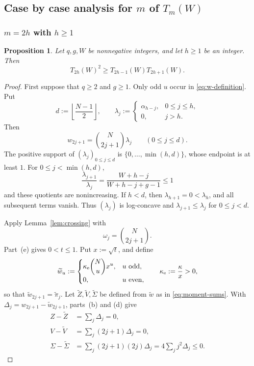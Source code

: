 \documentclass[12pt]{amsart}
\theoremstyle{plain}
\newtheorem{proposition}[theorem]{Proposition}
\theoremstyle{definition}
\theoremstyle{remark}
\begin{document}
\subsection{Case by case analysis for \(m\) of \(T_m(W)\)}

\subsubsection{\(m=2h\) with \(h\ge1\)}

\begin{proposition}\label{prop:even-centres}
Let \(q,g,W\) be nonnegative integers, and let \(h\ge1\) be an integer.
Then
\[
 T_{2h}(W)^2\ge T_{2h-1}(W)T_{2h+1}(W).
\]
\end{proposition}

\begin{proof}
First suppose that \(q\ge2\) and \(g\ge1\).  Only odd \(u\) occur in
\eqref{eq:w-definition}.  Put
\[
 d:=\left\lfloor\frac{N-1}{2}\right\rfloor,
 \qquad
 \lambda_j:=
 \begin{cases}
  \alpha_{h-j},&0\le j\le h,\\
  0,&j>h.
 \end{cases}
\]
Then
\[
 w_{2j+1}=\binom N{2j+1}\lambda_j
 \qquad(0\le j\le d).
\]
The positive support of \((\lambda_j)_{0\le j\le d}\) is
\(\{0,\ldots,\min(h,d)\}\), whose endpoint is at least \(1\).  For
\(0\le j<\min(h,d)\),
\[
 \frac{\lambda_{j+1}}{\lambda_j}
 =
 \frac{W+h-j}{W+h-j+g-1}
 \le1
\]
and these quotients are nonincreasing.  If \(h<d\), then
\(\lambda_{h+1}=0<\lambda_h\), and all subsequent terms vanish.  Thus
\((\lambda_j)\) is log-concave and
\(\lambda_{j+1}\le\lambda_j\) for \(0\le j<d\).

Apply Lemma~\ref{lem:crossing} with
\[
 \omega_j=\binom N{2j+1}.
\]
Part~\textup{(e)} gives \(0<t\le1\).  Put \(x:=\sqrt t\), and define
\[
 \widetilde w_u:=
 \begin{cases}
  \displaystyle\kappa_{\mathrm e}\binom Nu x^u,&u\ {\rm odd},\\
  0,&u\ {\rm even},
 \end{cases}
 \qquad
 \kappa_{\mathrm e}:=\frac{\kappa}{x}>0,
\]
so that \(\widetilde w_{2j+1}=\widetilde\pi_j\).  Let
\(\widetilde Z,\widetilde V,\widetilde\Sigma\) be defined from
\(\widetilde w\) as in \eqref{eq:moment-sums}.  With
\(\Delta_j=w_{2j+1}-\widetilde w_{2j+1}\), parts~\textup{(b)} and
\textup{(d)} give
\[
\begin{aligned}
 Z-\widetilde Z
 &=\sum_j\Delta_j=0,\\
 V-\widetilde V
 &=\sum_j(2j+1)\Delta_j=0,\\
 \Sigma-\widetilde\Sigma
 &=\sum_j(2j+1)(2j)\Delta_j
 =4\sum_jj^2\Delta_j\le0.
\end{aligned}
\]


\end{proof}
\end{document}
